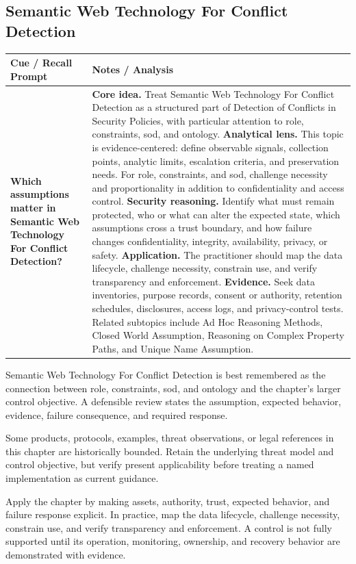 \documentclass[11pt]{article}
\newcommand{\CornellHeader}{%
\rowcolor{Navy}\color{white}\bfseries Cue / Recall Prompt & \color{white}\bfseries Notes / Analysis\\\hline}
\newcommand{\CornellRow}[2]{%
\cellcolor{CueGray}\RaggedRight\textbf{#1} & \RaggedRight #2\\\hline}
\begin{document}
\subsection*{Semantic Web Technology For Conflict Detection}
\begin{longtable}{>{\RaggedRight\arraybackslash}p{}|>{\RaggedRight\arraybackslash}p{}}
\CornellHeader
\CornellRow{Which assumptions matter in Semantic Web Technology For Conflict Detection?}{\textbf{Core idea.} Treat Semantic Web Technology For Conflict Detection as a structured part of Detection of Conflicts in Security Policies, with particular attention to role, constraints, sod, and ontology. \textbf{Analytical lens.} This topic is evidence-centered: define observable signals, collection points, analytic limits, escalation criteria, and preservation needs. For role, constraints, and sod, challenge necessity and proportionality in addition to confidentiality and access control. \textbf{Security reasoning.} Identify what must remain protected, who or what can alter the expected state, which assumptions cross a trust boundary, and how failure changes confidentiality, integrity, availability, privacy, or safety. \textbf{Application.} The practitioner should map the data lifecycle, challenge necessity, constrain use, and verify transparency and enforcement. \textbf{Evidence.} Seek data inventories, purpose records, consent or authority, retention schedules, disclosures, access logs, and privacy-control tests. Related subtopics include Ad Hoc Reasoning Methods, Closed World Assumption, Reasoning on Complex Property Paths, and Unique Name Assumption.}
\end{longtable}
\begin{topicsummary}
Semantic Web Technology For Conflict Detection is best remembered as the connection between role, constraints, sod, and ontology and the chapter's larger control objective. A defensible review states the assumption, expected behavior, evidence, failure consequence, and required response.
\end{topicsummary}
\begin{historybox}
Some products, protocols, examples, threat observations, or legal references in this chapter are historically bounded. Retain the underlying threat model and control objective, but verify present applicability before treating a named implementation as current guidance.
\end{historybox}
\begin{defensebox}
Apply the chapter by making assets, authority, trust, expected behavior, and failure response explicit. In practice, map the data lifecycle, challenge necessity, constrain use, and verify transparency and enforcement. A control is not fully supported until its operation, monitoring, ownership, and recovery behavior are demonstrated with evidence.
\end{defensebox}
\end{document}
